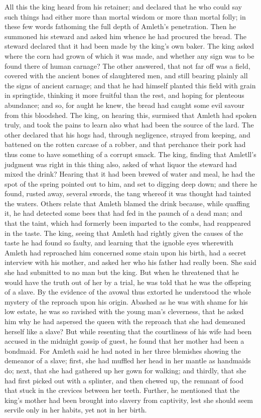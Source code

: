 \documentclass[10pt,a4paper]{report}
\begin{document}
All this the king heard from his retainer; and declared that he who could say such things had either more than mortal wisdom or more than mortal folly; in these few words fathoming the full depth of Amleth's penetration. Then he summoned his steward and asked him whence he had procured the bread. The steward declared that it had been made by the king's own baker. The king asked where the corn had grown of which it was made, and whether any sign was to be found there of human carnage? The other answered, that not far off was a field, covered with the ancient bones of slaughtered men, and still bearing plainly all the signs of ancient carnage; and that he had himself planted this field with grain in springtide, thinking it more fruitful than the rest, and hoping for plenteous abundance; and so, for aught he knew, the bread had caught some evil savour from this bloodshed. The king, on hearing this, surmised that Amleth had spoken truly, and took the pains to learn also what had been the source of the lard. The other declared that his hogs had, through negligence, strayed from keeping, and battened on the rotten carcase of a robber, and that perchance their pork had thus come to have something of a corrupt smack. The king, finding that Amletll's judgment was right in this thing also, asked of what liquor the steward had mixed the drink? Hearing that it had been brewed of water and meal, he had the spot of the spring pointed out to him, and set to digging deep down; and there he found, rusted away, several swords, the tang whereof it was thought had tainted the waters. Others relate that Amleth blamed the drink because, while quaffing it, he had detected some bees that had fed in the paunch of a dead man; and that the taint, which had formerly been imparted to the combs, had reappeared in the taste. The king, seeing that Amleth had rightly given the causes of the taste he had found so faulty, and learning that the ignoble eyes wherewith Amleth had reproached him concerned some stain upon his birth, had a secret interview with his mother, and asked her who his father had really been. She said she had submitted to no man but the king. But when he threatened that he would have the truth out of her by a trial, he was told that he was the offspring of a slave. By the evidence of the avowal thus extorted he understood the whole mystery of the reproach upon his origin. Abashed as he was with shame for his low estate, he was so ravished with the young man's cleverness, that he asked him why he had aspersed the queen with the reproach that she had demeaned herself like a slave? But while resenting that the courtliness of his wife had been accused in the midnight gossip of guest, he found that her mother had been a bondmaid. For Amleth said he had noted in her three blemishes showing the demeanor of a slave; first, she had muffled her head in her mantle as handmaids do; next, that she had gathered up her gown for walking; and thirdly, that she had first picked out with a splinter, and then chewed up, the remnant of food that stuck in the crevices between her teeth. Further, he mentioned that the king's mother had been brought into slavery from captivity, lest she should seem servile only in her habits, yet not in her birth.\\
\end{document}
